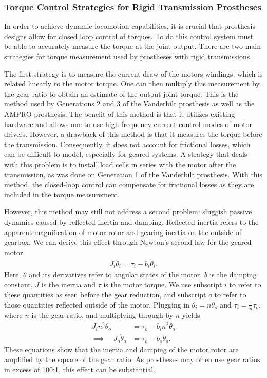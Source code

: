 \subsubsection{Torque Control Strategies for Rigid Transmission Prostheses}
In order to achieve dynamic locomotion capabilities, it is crucial that
prosthesis designs allow for closed loop control of torques. To do this control
system must be able to accurately measure the torque at the joint output. There
are two main strategies for torque measurement used by prostheses with rigid
transmissions.

The first strategy is to measure the current draw of the motors windings, which
is related linearly to the motor torque. One can then multiply this measurement
by the gear ratio to obtain an estimate of the output joint torque. This is the
method used by Generations 2 and 3 of the Vanderbilt prosthesis as well as the
AMPRO prosthesis. The benefit of this method is that it utilizes existing
hardware and allows one to use high frequency current control modes of motor
drivers. However, a drawback of this method is that it measures the torque
before the transmission. Consequently, it does not account for frictional
losses, which can be difficult to model, especially for geared systems. A
strategy that deals with this problem is to install load cells in series with
the motor after the transmission, as was done on Generation 1 of the Vanderbilt
prosthesis. With this method, the closed-loop control can compensate for
frictional losses as they are included in the torque measurement. 

However, this method may still not address a second problem: sluggish passive
dynamics caused by reflected inertia and damping. Reflected inertia refers to
the apparent magnification of motor rotor and gearing inertia on the outside of
gearbox.  We can derive this effect through Newton's second law for the geared
motor
\begin{align}
    J_i \ddot{\theta}_i = \tau_i - b_i \dot{\theta}_i.
\end{align}
Here, $\theta$ and its derivatives refer to angular states of the motor, $b$
is the damping constant, $J$ is the inertia and $\tau$ is the motor torque. We
use subscript $i$ to refer to these quantities as seen before the gear
reduction, and subscript $o$ to refer to those quantities reflected outside of
the motor. Plugging in $\theta_i = n \theta_o$ and $\tau_i = \frac{1}{n}
\tau_o$, where $n$ is the gear ratio, and multiplying through by $n$ yields
\begin{align}
    J_i n^2 \ddot{\theta}_o &= \tau_o - b_i n^2 \dot{\theta}_o \\
    \implies \quad J_o \ddot{\theta}_o &= \tau_o - b_o \dot{\theta}_o.
\end{align}
These equations show that the inertia and damping of the motor rotor are
amplified by the square of the gear ratio. As prostheses may often use gear
ratios in excess of 100:1, this effect can be substantial. 

